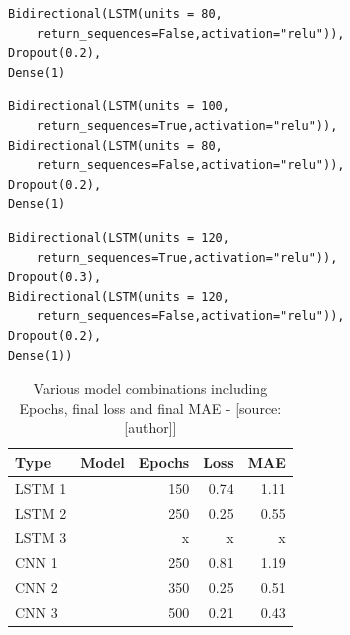 \begin{lrbox}{\codebox} %
\begin{lstlisting}[numbers=none, basicstyle=\tiny, numbersep=0pt, xleftmargin=0pt, xrightmargin=0pt, backgroundcolor=\color{white}]
Bidirectional(LSTM(units = 80,
 	return_sequences=False,activation="relu")),
Dropout(0.2),
Dense(1)
\end{lstlisting}
\end{lrbox} %


\begin{lrbox}{\codeboxtwo} %
\begin{lstlisting}[numbers=none, basicstyle=\tiny, numbersep=0pt, xleftmargin=0pt, xrightmargin=0pt, backgroundcolor=\color{white}]
Bidirectional(LSTM(units = 100,
	return_sequences=True,activation="relu")),
Bidirectional(LSTM(units = 80,
	return_sequences=False,activation="relu")),
Dropout(0.2),
Dense(1)
\end{lstlisting}
\end{lrbox} %

\begin{lrbox}{\codeboxthree} %
\begin{lstlisting}[numbers=none, basicstyle=\tiny, numbersep=0pt, xleftmargin=0pt, xrightmargin=0pt, backgroundcolor=\color{white}]
Bidirectional(LSTM(units = 120, 
	return_sequences=True,activation="relu")),
Dropout(0.3),
Bidirectional(LSTM(units = 120, 
	return_sequences=False,activation="relu")),
Dropout(0.2),
Dense(1))
\end{lstlisting}
\end{lrbox} %

\begin{table}[H]
\begin{tabular}{|l|p{9cm}|r|r|r|}
  \hline
  \textbf{Type} & \textbf{Model} & \textbf{Epochs} & \textbf{Loss} & \textbf{MAE} \\
  \hline
  LSTM 1& \usebox{\codebox} & 150 & 0.74 & 1.11 \\
  \hline
  LSTM 2& \usebox{\codeboxtwo} & 250 & 0.25 & 0.55 \\
  \hline
  LSTM 3& \usebox{\codeboxtwo} & x & x & x \\
  \hline
    CNN 1 & \usebox{\codeboxfour} & 250 & 0.81 & 1.19 \\
  \hline
   CNN 2& \usebox{\codeboxfive} & 350 & 0.25 & 0.51 \\
  \hline
   CNN 3& \usebox{\codeboxsix} & 500 & 0.21 & 0.43 \\
  \hline
\end{tabular}
\caption{Various model combinations including Epochs, final loss and final MAE - [source:[author]]}
	\label{tab:models}
\end{table}

